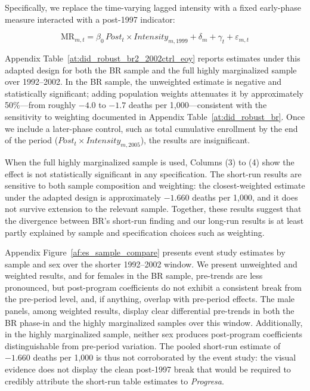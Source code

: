 \documentclass[12pt]{article}
\begin{document}
\p Specifically, we replace the time-varying lagged intensity with a fixed early-phase measure interacted with a post-1997 indicator:

\begin{equation}\label{eq:didadapted}
\text{MR}_{m,t}
= \beta_{0}\,\textit{Post}_{t}\times\textit{Intensity}_{m,1999}
+ \delta_{m} + \gamma_{t} + \varepsilon_{m,t}
\end{equation}

\p Appendix Table~\ref{at:did_robust_br2_2002ctrl_eoy} reports estimates under this adapted design for both the BR sample and the full highly marginalized sample over 1992--2002. In the BR sample, the unweighted estimate is negative and statistically significant; adding population weights attenuates it by approximately 50\%—from roughly $-4.0$ to $-1.7$ deaths per 1,000—consistent with the sensitivity to weighting documented in Appendix Table~\ref{at:did_robust_br}. Once we include a later-phase control, such as total cumulative enrollment by the end of the period ($\textit{Post}_{t}\times\textit{Intensity}_{m,2005}$), the results are insignificant. 

\p When the full highly marginalized sample is used, Columns (3) to (4) show the effect is not statistically significant in any specification. The short-run results are sensitive to both sample composition and weighting: the closest-weighted estimate under the adapted design is approximately $-1.660$ deaths per 1,000, and it does not survive extension to the relevant sample. Together, these results suggest that the divergence between BR's short-run finding and our long-run results is at least partly explained by sample and specification choices such as weighting. 

\p Appendix Figure~\ref{af:es_sample_compare} presents event study estimates by sample and sex over the shorter 1992--2002 window. We present unweighted and weighted results, and for females in the BR sample, pre-trends are less pronounced, but post-program coefficients do not exhibit a consistent break from the pre-period level, and, if anything, overlap with pre-period effects. The male panels, among weighted results, display clear differential pre-trends in both the BR phase-in and the highly marginalized samples over this window. Additionally, in the highly marginalized sample, neither sex produces post-program coefficients distinguishable from pre-period variation. The pooled short-run estimate of $-1.660$ deaths per 1,000 is thus not corroborated by the event study: the visual evidence does not display the clean post-1997 break that would be required to credibly attribute the short-run table estimates to \textit{Progresa}. 
\end{document}
